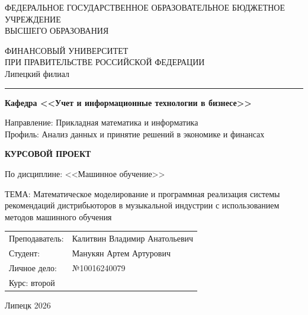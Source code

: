 \documentclass[14pt, a4paper]{extarticle}
\begin{document}
\thispagestyle{empty}
{\scriptsize
\begin{center}
ФЕДЕРАЛЬНОЕ ГОСУДАРСТВЕННОЕ ОБРАЗОВАТЕЛЬНОЕ БЮДЖЕТНОЕ УЧРЕЖДЕНИЕ\\
ВЫСШЕГО ОБРАЗОВАНИЯ 
\end{center}
}
{\bf
\begin{center}
ФИНАНСОВЫЙ УНИВЕРСИТЕТ\\
ПРИ ПРАВИТЕЛЬСТВЕ РОССИЙСКОЙ ФЕДЕРАЦИИ\\
Липецкий филиал
\end{center}
}
\hrule
\bigskip
{\small 
\begin{center}
\textbf{Кафедра <<Учет и информационные технологии в бизнесе>>}
\end{center}
}
\bigskip
\noindent Направление: Прикладная математика и информатика \\
\medskip
\noindent Профиль: Анализ данных и принятие решений в экономике и финансах
\vskip 2cm

\begin{center}
\textbf{КУРСОВОЙ ПРОЕКТ}
\end{center}
\noindent По дисциплине: <<Машинное обучение>>
\bigskip

\noindent ТЕМА: Математическое моделирование и программная реализация системы рекомендаций дистрибьюторов в музыкальной индустрии с использованием методов машинного обучения

\vfill %

\begin{flushright}
\begin{minipage}{0.6\textwidth}
\begin{tabular}{ll}
Преподаватель: & Калитвин Владимир Анатольевич \\
Студент:       & Манукян Артем Артурович \\
Личное дело:   & №10016240079 \\
Курс: второй \\
\end{tabular}
\end{minipage}
\end{flushright}

\vfill %

\begin{center}
Липецк 2026
\end{center}

\newpage
\tableofcontents
\newpage

\end{document}

